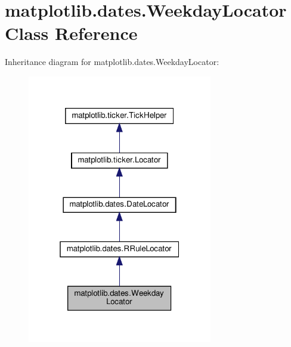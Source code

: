 \hypertarget{classmatplotlib_1_1dates_1_1WeekdayLocator}{}\section{matplotlib.\+dates.\+Weekday\+Locator Class Reference}
\label{classmatplotlib_1_1dates_1_1WeekdayLocator}


Inheritance diagram for matplotlib.\+dates.\+Weekday\+Locator\+:
\nopagebreak
\begin{figure}[H]
\begin{center}
\leavevmode
\includegraphics[width=229pt]{classmatplotlib_1_1dates_1_1WeekdayLocator__inherit__graph}
\end{center}
\end{figure}


